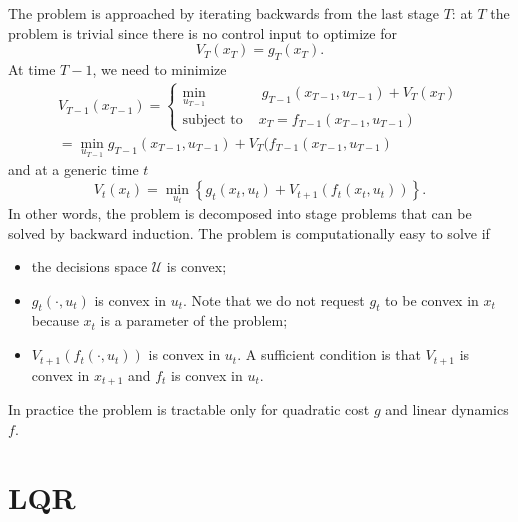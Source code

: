 The problem is approached by iterating backwards from the last stage $T$: at $T$ the problem is trivial since there is no control input to optimize for
\begin{equation*}
  V_T(x_T) = g_T(x_T).
\end{equation*}
At time $T-1$, we need to minimize
\begin{align*}
  V_{T-1}(x_{T-1}) = \left\{
  \begin{aligned}
    \min_{u_{T-1}} &\ g_{T-1}(x_{T-1},u_{T-1}) + V_T(x_T) \\
    \text{subject to } & x_T = f_{T-1}(x_{T-1},u_{T-1})
  \end{aligned}
    \right. \\
  = \min_{u_{T-1}} g_{T-1}(x_{T-1},u_{T-1}) + V_T(f_{T-1}(x_{T-1},u_{T-1})
\end{align*}
and at a generic time $t$
\begin{equation}
  \label{eq:backward-induction}
  V_t(x_t) = \min_{u_t} \left\{ g_t(x_t,u_t) + V_{t+1}(f_t(x_t,u_t)) \right\}.
\end{equation}
In other words, the problem is decomposed into stage problems that can be solved by backward induction.
The problem is computationally easy to solve if
\begin{itemize}
\item the decisions space $\mathcal{U}$ is convex;
\item $g_t(\cdot,u_t)$ is convex in $u_t$. Note that we do not request $g_t$ to be convex in $x_t$ because $x_t$ is a parameter of the problem;
\item $V_{t+1}(f_t(\cdot,u_t))$ is convex in $u_t$. A sufficient condition is that $V_{t+1}$ is convex in $x_{t+1}$ and $f_t$ is convex in $u_t$.
\end{itemize}
In practice the problem is tractable only for quadratic cost $g$ and linear dynamics $f$.

\section{LQR}
\label{sec:lqr}

